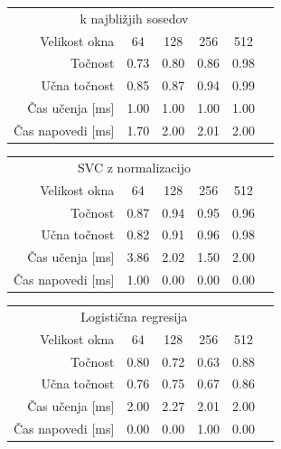 \documentclass[11pt,a4paper]{article}
\begin{document}
\begin{center}
\begin{tabular}{r | c c c c c}
    \multicolumn{5}{c}{k najbližjih sosedov}\\
    \tiny{Velikost okna} & \small{64} & \small{128} & \small{256} & \small{512}\\ \hline
    \tiny{Točnost} & \small{0.73} & \small{0.80} & \small{0.86} & \small{0.98}\\
    \tiny{Učna točnost} & \small{0.85} & \small{0.87} & \small{0.94} & \small{0.99}\\
    \tiny{Čas učenja [ms]} & \small{1.00} & \small{1.00} & \small{1.00} & \small{1.00}\\
    \tiny{Čas napovedi [ms]} & \small{1.70} & \small{2.00} & \small{2.01} & \small{2.00}\\
    \end{tabular}

\begin{tabular}{r | c c c c c}
    \multicolumn{5}{c}{SVC z normalizacijo}\\
    \tiny{Velikost okna} & \small{64} & \small{128} & \small{256} & \small{512}\\ \hline
    \tiny{Točnost} & \small{0.87} & \small{0.94} & \small{0.95} & \small{0.96}\\
    \tiny{Učna točnost} & \small{0.82} & \small{0.91} & \small{0.96} & \small{0.98}\\
    \tiny{Čas učenja [ms]} & \small{3.86} & \small{2.02} & \small{1.50} & \small{2.00}\\
    \tiny{Čas napovedi [ms]} & \small{1.00} & \small{0.00} & \small{0.00} & \small{0.00}\\
    \end{tabular}

\begin{tabular}{r | c c c c c}
    \multicolumn{5}{c}{Logistična regresija}\\
    \tiny{Velikost okna} & \small{64} & \small{128} & \small{256} & \small{512}\\ \hline
    \tiny{Točnost} & \small{0.80} & \small{0.72} & \small{0.63} & \small{0.88}\\
    \tiny{Učna točnost} & \small{0.76} & \small{0.75} & \small{0.67} & \small{0.86}\\
    \tiny{Čas učenja [ms]} & \small{2.00} & \small{2.27} & \small{2.01} & \small{2.00}\\
    \tiny{Čas napovedi [ms]} & \small{0.00} & \small{0.00} & \small{1.00} & \small{0.00}\\
    \end{tabular}


\end{center}
\end{document}
